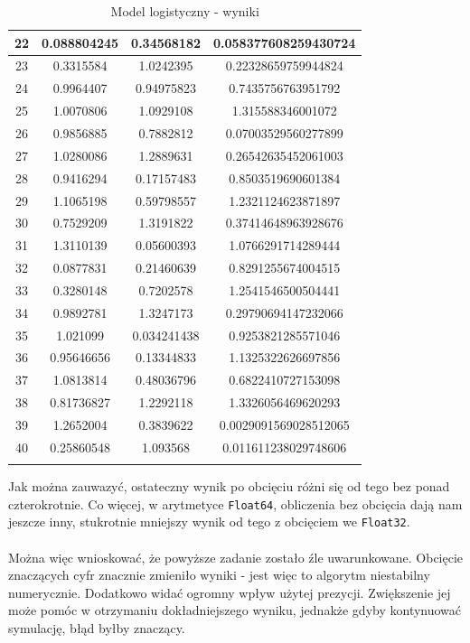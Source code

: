 \documentclass[15pt, a4paper]{article}
\begin{document}
\begin{longtable}{|c|c|c|c|}
        22 & 0.088804245 & 0.34568182 & 0.058377608259430724 \\ \hline
        23 & 0.3315584 & 1.0242395 & 0.22328659759944824 \\ \hline
        24 & 0.9964407 & 0.94975823 & 0.7435756763951792 \\ \hline
        25 & 1.0070806 & 1.0929108 & 1.315588346001072 \\ \hline
        26 & 0.9856885 & 0.7882812 & 0.07003529560277899 \\ \hline
        27 & 1.0280086 & 1.2889631 & 0.26542635452061003 \\ \hline
        28 & 0.9416294 & 0.17157483 & 0.8503519690601384 \\ \hline
        29 & 1.1065198 & 0.59798557 & 1.2321124623871897 \\ \hline
        30 & 0.7529209 & 1.3191822 & 0.37414648963928676 \\ \hline
        31 & 1.3110139 & 0.05600393 & 1.0766291714289444 \\ \hline
        32 & 0.0877831 & 0.21460639 & 0.8291255674004515 \\ \hline
        33 & 0.3280148 & 0.7202578 & 1.2541546500504441 \\ \hline
        34 & 0.9892781 & 1.3247173 & 0.29790694147232066 \\ \hline
        35 & 1.021099 & 0.034241438 & 0.9253821285571046 \\ \hline
        36 & 0.95646656 & 0.13344833 & 1.1325322626697856 \\ \hline
        37 & 1.0813814 & 0.48036796 & 0.6822410727153098 \\ \hline
        38 & 0.81736827 & 1.2292118 & 1.3326056469620293 \\ \hline
        39 & 1.2652004 & 0.3839622 & 0.0029091569028512065 \\ \hline
        40 & 0.25860548 & 1.093568 & 0.011611238029748606 \\ \hline
    \caption{Model logistyczny - wyniki}
\end{longtable}

\vspace{0.5cm}

\noindent Jak można zauwazyć, ostateczny wynik po obcięciu różni się od tego bez ponad czterokrotnie. Co więcej, w arytmetyce \verb|Float64|, obliczenia bez obcięcia dają nam jeszcze inny, stukrotnie mniejszy wynik od tego z obcięciem we \verb|Float32|.\\\\
\noindent Można więc wnioskować, że powyższe zadanie zostało źle uwarunkowane. Obcięcie znaczących cyfr znacznie zmieniło wyniki - jest więc to algorytm niestabilny numerycznie.  Dodatkowo widać ogromny wpływ użytej prezycji. Zwiększenie jej może pomóc w otrzymaniu dokładniejszego wyniku, jednakże gdyby kontynuować symulację, błąd byłby znaczący.
\end{document}
